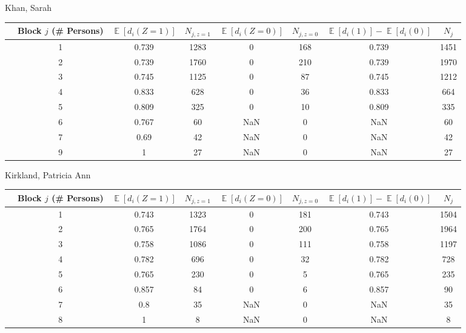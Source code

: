 \documentclass[11pt,notitlepage]{article}
\def\E{\mathop{\mathbb{E}}}
\begin{document}
\clearpage

Khan, Sarah
\begin{table}[h!]\small
\begin{center}
\begin{tabular}{rc|cc|cc|cc}
  \hline
 & Block $j$ (\# Persons) & $\E[d_i(Z=1)]$ & $N_{j, z=1}$ & $\E[d_i(Z=0)]$ & $N_{j, z=0}$ & $\E[d_i(1)]-\E[d_i(0)]$ & $N_j$ \\ 
  \hline
  & 1 & 0.739 & 1283 & 0 & 168 & 0.739 & 1451 \\ 
  & 2 & 0.739 & 1760 & 0 & 210 & 0.739 & 1970 \\ 
  & 3 & 0.745 & 1125 & 0 & 87 & 0.745 & 1212 \\ 
  & 4 & 0.833 & 628 & 0 & 36 & 0.833 & 664 \\ 
  & 5 & 0.809 & 325 & 0 & 10 & 0.809 & 335 \\ 
  & 6 & 0.767 & 60 & NaN & 0 & NaN & 60 \\ 
  & 7 & 0.69 & 42 & NaN & 0 & NaN & 42 \\ 
  & 9 & 1 & 27 & NaN & 0 & NaN & 27 \\ 
   \hline
\end{tabular}
\end{center}
\end{table}


Kirkland, Patricia Ann
\begin{table}[h!]\small
\begin{center}
\begin{tabular}{rc|cc|cc|cc}
  \hline
 & Block $j$ (\# Persons) & $\E[d_i(Z=1)]$ & $N_{j, z=1}$ & $\E[d_i(Z=0)]$ & $N_{j, z=0}$ & $\E[d_i(1)]-\E[d_i(0)]$ & $N_j$ \\ 
  \hline
 & 1 & 0.743 & 1323 & 0 & 181 & 0.743 & 1504 \\ 
 & 2 & 0.765 & 1764 & 0 & 200 & 0.765 & 1964 \\ 
 & 3 & 0.758 & 1086 & 0 & 111 & 0.758 & 1197 \\ 
 & 4 & 0.782 & 696 & 0 & 32 & 0.782 & 728 \\ 
 & 5 & 0.765 & 230 & 0 & 5 & 0.765 & 235 \\ 
 & 6 & 0.857 & 84 & 0 & 6 & 0.857 & 90 \\ 
 & 7 & 0.8 & 35 & NaN & 0 & NaN & 35 \\ 
 & 8 & 1 & 8 & NaN & 0 & NaN & 8 \\ 
   \hline
\end{tabular}
\end{center}
\end{table}
\end{document}
